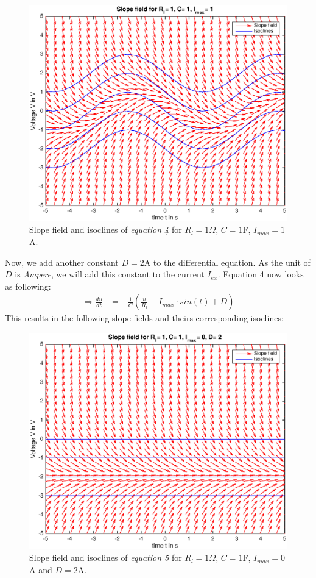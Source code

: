 \documentclass[
a4paper, 
12pt, 
]{article}
\begin{document}
\begin{figure}[h]
	\centering
	\includegraphics[width=0.85\linewidth]{Plots/lif_2}
	\caption{Slope field and isoclines of \textit{equation 4} for  $R_l = 1 \Omega$, $C=1$F, $I_{max}=1$A.}
	\label{fig:lif_2}
\end{figure}

\clearpage
Now, we add another constant $D = 2$A to the differential equation. As the unit of $D$ is \textit{Ampere}, we will add this constant to the current $I_{ex}$. Equation 4 now looks as following:
\begin{align}
\Rightarrow \frac{du}{dt} &= -\frac{1}{C}\left(\frac{u}{R_l} + I_{max}\cdot sin(t) + D \right) 
\end{align}
This results in the following slope fields and theirs corresponding isoclines:
\begin{figure}[h]
	\centering
	\includegraphics[width=0.85\linewidth]{Plots/lif_3}
	\caption{Slope field and isoclines of \textit{equation 5} for  $R_l = 1 \Omega$, $C=1$F, $I_{max}=0$A and $D=2$A.}
	\label{fig:lif_3}
\end{figure}
\end{document}
